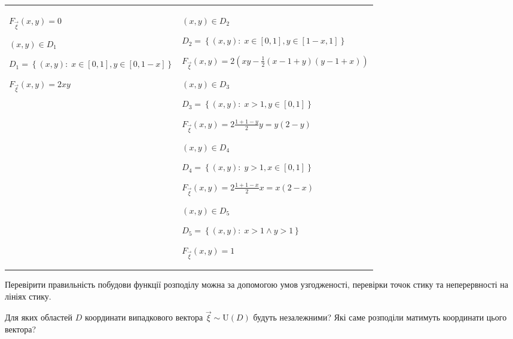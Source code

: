 \begin{example}
\begin{enumerate}
\begin{tabular}{p{6cm} p{6cm}}
            $F_{\vec{\xi}}(x, y) = 0$ 
            
            \vspace{5mm}
            
            $(x, y) \in D_1$
            
            $D_1 = \left\{(x, y):\; x \in \left[0, 1\right],
            y \in \left[0, 1-x\right]\right\}$

            $F_{\vec{\xi}}(x, y) = 2xy$&
            $(x, y) \in D_2$
            
            $D_2 = \left\{(x, y):\; x \in \left[0, 1\right],
            y \in \left[1-x, 1\right]\right\}$

            $F_{\vec{\xi}}(x, y) = 2(xy - \frac{1}{2}(x-1+y)(y-1+x))$

            \vspace{5mm}

            $(x, y) \in D_3$
            
            $D_3 = \left\{(x, y):\; x > 1,
            y \in \left[0, 1\right]\right\}$

            $F_{\vec{\xi}}(x, y) = 2\frac{1+1-y}{2}y = y(2-y)$
            
            \vspace{5mm}

            $(x, y) \in D_4$
            
            $D_4 = \left\{(x, y):\; y > 1,
            x \in \left[0, 1\right]\right\}$

            $F_{\vec{\xi}}(x, y) = 2\frac{1+1-x}{2}x = x(2-x)$
            
            \vspace{5mm}
            
            $(x, y) \in D_5$
            
            $D_5 = \left\{(x, y):\; x > 1 \land y > 1\right\}$

            $F_{\vec{\xi}}(x, y) = 1$\\
           
        \end{tabular}
    \end{enumerate}
\end{example}
\begin{remark}
    Перевірити правильність побудови функції розподілу можна за допомогою 
    умов узгодженості, перевірки точок стику та неперервності на лініях стику.
\end{remark}
\begin{exercise}
    Для яких областей $D$ координати випадкового вектора $\vec{\xi} \sim \mathrm{U}(D)$
    будуть незалежними? Які саме розподіли матимуть координати цього вектора?
\end{exercise}
